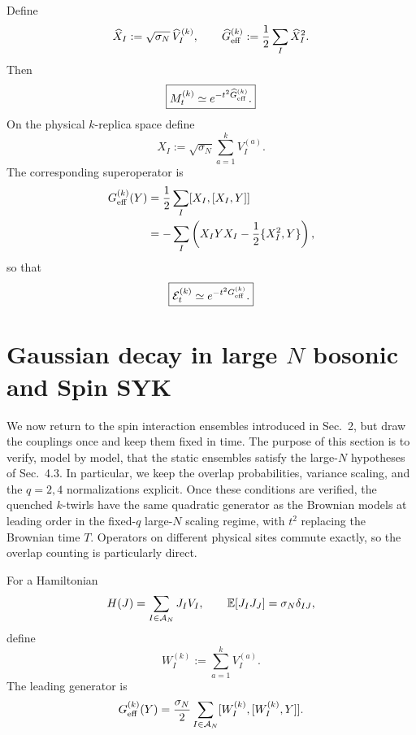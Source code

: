 \documentclass{article}
\theoremstyle{definition}
\begin{document}
Define
\begin{equation}
    \widehat X_I
    :=\sqrt{\sigma_N}\,\widehat V_I^{(k)},
    \qquad
    \widehat G_{\rm eff}^{(k)}
    :=\frac12\sum_I\widehat X_I^2.
\end{equation}
Then
\begin{equation}
    \boxed{
    M_t^{(k)}\simeq e^{-t^2\widehat G_{\rm eff}^{(k)}}.
    }
\end{equation}
On the physical $k$-replica space define
\begin{equation}
    X_I
    :=\sqrt{\sigma_N}\sum_{a=1}^kV_I^{(a)}.
\end{equation}
The corresponding superoperator is
\begin{align}
    G_{\rm eff}^{(k)}(Y)
    &=\frac12\sum_I[X_I,[X_I,Y]]
    \nonumber\\
    &=-\sum_I
    \left(
       X_IYX_I-\frac12\{X_I^2,Y\}
    \right),
\end{align}
so that
\begin{equation}
    \boxed{
    {\cal E}_t^{(k)}\simeq e^{-t^2G_{\rm eff}^{(k)}}.
    }
\end{equation}

\section{Gaussian decay in large $N$ bosonic and Spin SYK}
\label{sec:bosonic_spin_syk_gaussian_regulator}

We now return to the spin interaction ensembles introduced in Sec.~2, but
draw the couplings once and keep them fixed in time.  The purpose of this
section is to verify, model by model, that the static ensembles satisfy the
large-$N$ hypotheses of Sec.~4.3.  In particular, we keep the overlap
probabilities, variance scaling, and the $q=2,4$ normalizations explicit.
Once these conditions are verified, the quenched $k$-twirls have the same
quadratic generator as the Brownian models at leading order in the fixed-$q$
large-$N$ scaling regime, with $t^2$ replacing the Brownian time $T$.
Operators on different physical sites commute exactly, so the overlap
counting is particularly direct.

For a Hamiltonian
\begin{equation}
    H(J)=\sum_{I\in{\cal A}_N}J_IV_I,
    \qquad
    \mathbb E[J_IJ_J]=\sigma_N\delta_{IJ},
\end{equation}
define
\begin{equation}
    W_I^{(k)}:=\sum_{a=1}^kV_I^{(a)}.
\end{equation}
The leading generator is
\begin{equation}
    G_{\rm eff}^{(k)}(Y)
    =\frac{\sigma_N}{2}
    \sum_{I\in{\cal A}_N}
    [W_I^{(k)},[W_I^{(k)},Y]].
\end{equation}
\end{document}
